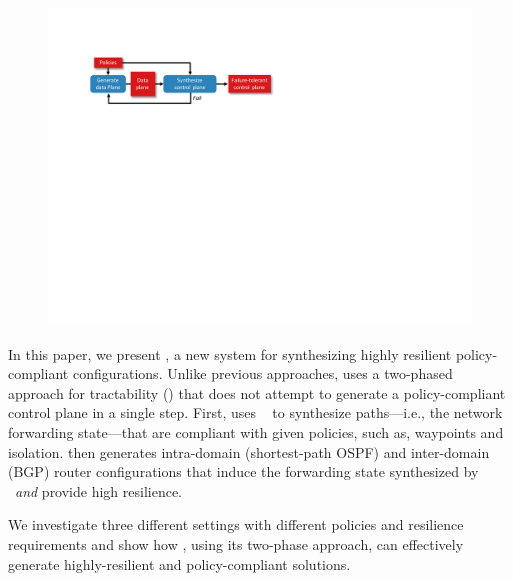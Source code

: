 \begin{figure}
	\includegraphics[width=\linewidth]{figures/architecture.pdf}
	\label{fig:architecture}
\end{figure}

In this paper, we present \name, a new system for synthesizing
highly resilient policy-compliant configurations.
Unlike previous approaches, \name uses a two-phased approach for tractability
() 
that does not attempt to generate 
a policy-compliant control plane in a single step.
First, \name 
uses \genesis~\cite{genesis}
to synthesize paths---i.e., the network forwarding state---that are compliant
with given policies, such as, waypoints and isolation.
\name then generates 
intra-domain (shortest-path OSPF) and inter-domain (BGP) router configurations
that induce the forwarding
state synthesized by \genesis\ {\em and} provide high resilience. 

We investigate three different settings with different policies and
resilience requirements and show how \name, using its two-phase
approach, can effectively generate highly-resilient and
policy-compliant solutions.

